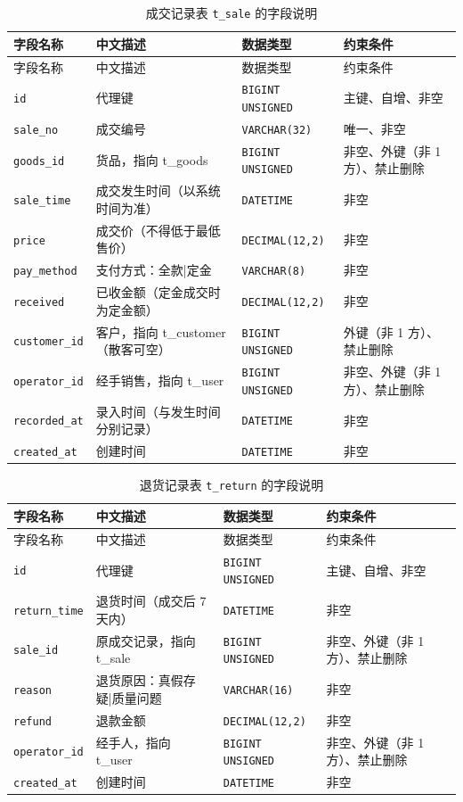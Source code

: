 \documentclass[12pt, a4paper]{ctexart}
\newcommand{\code}[1]{\texttt{\small #1}}
\begin{document}
\begin{longtable}{@{}p{3.1cm} p{4.5cm} p{2.4cm} p{4.5cm}@{}}
\caption{成交记录表 \code{t\_sale} 的字段说明}\label{tab:f-t-sale}\\
\toprule
字段名称 & 中文描述 & 数据类型 & 约束条件 \\
\midrule
\endfirsthead
\toprule
字段名称 & 中文描述 & 数据类型 & 约束条件 \\
\midrule
\endhead
\bottomrule
\endlastfoot
\code{id} & 代理键 & \code{BIGINT UNSIGNED} & 主键、自增、非空 \\
\code{sale\_no} & 成交编号 & \code{VARCHAR(32)} & 唯一、非空 \\
\code{goods\_id} & 货品，指向 t\_goods & \code{BIGINT UNSIGNED} & 非空、外键（非 1 方）、禁止删除 \\
\code{sale\_time} & 成交发生时间（以系统时间为准） & \code{DATETIME} & 非空 \\
\code{price} & 成交价（不得低于最低售价） & \code{DECIMAL(12,2)} & 非空 \\
\code{pay\_method} & 支付方式：全款|定金 & \code{VARCHAR(8)} & 非空 \\
\code{received} & 已收金额（定金成交时为定金额） & \code{DECIMAL(12,2)} & 非空 \\
\code{customer\_id} & 客户，指向 t\_customer（散客可空） & \code{BIGINT UNSIGNED} & 外键（非 1 方）、禁止删除 \\
\code{operator\_id} & 经手销售，指向 t\_user & \code{BIGINT UNSIGNED} & 非空、外键（非 1 方）、禁止删除 \\
\code{recorded\_at} & 录入时间（与发生时间分别记录） & \code{DATETIME} & 非空 \\
\code{created\_at} & 创建时间 & \code{DATETIME} & 非空 \\
\end{longtable}

\begin{longtable}{@{}p{3.1cm} p{4.5cm} p{2.4cm} p{4.5cm}@{}}
\caption{退货记录表 \code{t\_return} 的字段说明}\label{tab:f-t-return}\\
\toprule
字段名称 & 中文描述 & 数据类型 & 约束条件 \\
\midrule
\endfirsthead
\toprule
字段名称 & 中文描述 & 数据类型 & 约束条件 \\
\midrule
\endhead
\bottomrule
\endlastfoot
\code{id} & 代理键 & \code{BIGINT UNSIGNED} & 主键、自增、非空 \\
\code{return\_time} & 退货时间（成交后 7 天内） & \code{DATETIME} & 非空 \\
\code{sale\_id} & 原成交记录，指向 t\_sale & \code{BIGINT UNSIGNED} & 非空、外键（非 1 方）、禁止删除 \\
\code{reason} & 退货原因：真假存疑|质量问题 & \code{VARCHAR(16)} & 非空 \\
\code{refund} & 退款金额 & \code{DECIMAL(12,2)} & 非空 \\
\code{operator\_id} & 经手人，指向 t\_user & \code{BIGINT UNSIGNED} & 非空、外键（非 1 方）、禁止删除 \\
\code{created\_at} & 创建时间 & \code{DATETIME} & 非空 \\
\end{longtable}
\end{document}
